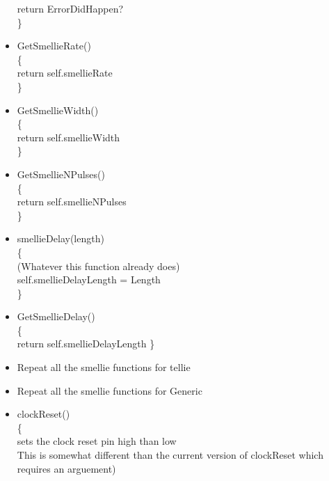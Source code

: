 \documentclass[12pt,a4paper]{article}
\begin{document}
\begin{itemize}
return ErrorDidHappen?\\
\}\\
\item
GetSmellieRate()\\
\{\\
return self.smellieRate\\
\}\\
\item
GetSmellieWidth()\\
\{\\
return self.smellieWidth\\
\}\\
\item
GetSmellieNPulses()\\
\{\\
return self.smellieNPulses\\
\}\\
\item
smellieDelay(length)\\
\{\\
(Whatever this function already does)\\
self.smellieDelayLength = Length\\
\}\\
\item
GetSmellieDelay()\\
\{\\
return self.smellieDelayLength
\}\\
\item
Repeat all the smellie functions for tellie\\
\item
Repeat all the smellie functions for Generic\\
\item
clockReset()\\
\{\\
sets the clock reset pin high than low\\
This is somewhat different than the current version of clockReset which
requires an arguement)\\


\end{itemize}
\end{document}
